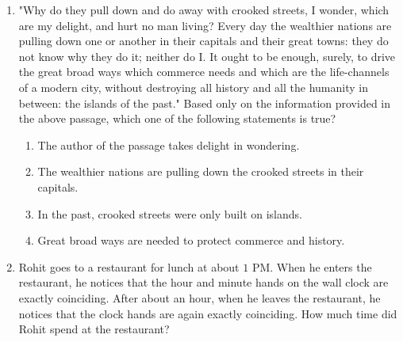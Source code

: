 \documentclass[journal,12pt,onecolumn]{IEEEtran}
\theoremstyle{remark}
\begin{document}
\begin{enumerate}
\begin{enumerate}
\end{enumerate}

\item "Why do they pull down and do away with crooked streets, I wonder, which are my delight, and hurt no man living? Every day the wealthier nations are pulling down one or another in their capitals and their great towns: they do not know why they do it; neither do I. It ought to be enough, surely, to drive the great broad ways which commerce needs and which are the life-channels of a modern city, without destroying all history and all the humanity in between: the islands of the past." 
Based only on the information provided in the above passage, which one of the following statements is true? \hfill{}
\begin{enumerate}
    \item The author of the passage takes delight in wondering.
    \item The wealthier nations are pulling down the crooked streets in their capitals.
    \item In the past, crooked streets were only built on islands.
    \item Great broad ways are needed to protect commerce and history.
\end{enumerate}

\item Rohit goes to a restaurant for lunch at about $1$ PM. When he enters the restaurant, he notices that the hour and minute hands on the wall clock are exactly coinciding. After about an hour, when he leaves the restaurant, he notices that the clock hands are again exactly coinciding. How much time  did Rohit spend at the restaurant? \hfill{}
\begin{enumerate}
\end{enumerate}
\end{enumerate}
\end{document}
